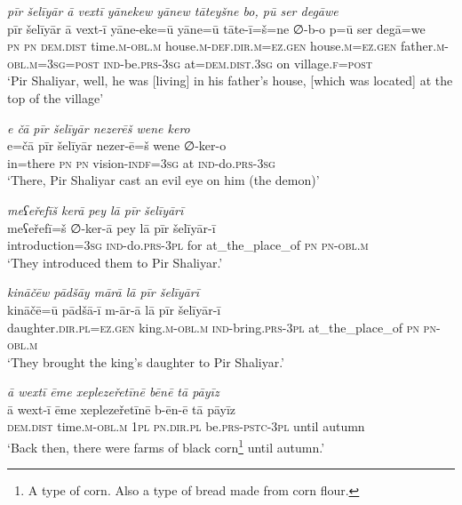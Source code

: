 \ea \label{ZP.65}
\textit{pīr šelīyār ā vextī yānekew yānew tāteyšne bo, pū ser degāwe} \\ 
\gll pīr šelīyār ā vext-ī yāne-eke=ū yāne=ū tāte-ī=š=ne ∅-b-o p=ū ser degā=we \\ 
 \textsc{pn} \textsc{pn} \textsc{dem.dist} time\textsc{.m}\textsc{-obl}\textsc{.m} house\textsc{.m}\textsc{-def}\textsc{.dir}\textsc{.m}\textsc{\textsc{=ez.gen}} house\textsc{.m}\textsc{\textsc{=ez.gen}} father\textsc{.m}\textsc{-obl}\textsc{.m}\textsc{=3sg}\textsc{=\textsc{post}} \textsc{ind-}be\textsc{.prs}\textsc{-3sg} at=\textsc{dem.dist}\textsc{.3sg} on village\textsc{.f}\textsc{=\textsc{post}} \\ 
\glt `Pir Shaliyar, well, he was [living] in his father’s house, [which was located] at the top of the village'
\z 
 
\ea \label{ZP.78}
\textit{e čā pīr šelīyār nezerēš wene kero} \\ 
\gll e=čā pīr šelīyār nezer-ē=š wene ∅-ker-o \\ 
 in=there \textsc{pn} \textsc{pn} vision\textsc{-indf}\textsc{=3sg} at \textsc{ind-}do\textsc{.prs}\textsc{-3sg} \\ 
\glt `There, Pir Shaliyar cast an evil eye on him (the demon)'
\z 
 
\ea \label{ZP.92}
\textit{meʕeřefīš kerā pey lā pīr šelīyārī} \\ 
\gll meʕeřefī=š ∅-ker-ā pey lā pīr šelīyār-ī \\ 
 introduction\textsc{=3sg} \textsc{ind-}do\textsc{.prs}\textsc{-3pl} for at\_the\_place\_of \textsc{pn} \textsc{pn}\textsc{-obl}\textsc{.m} \\ 
\glt `They introduced them to Pir Shaliyar.'
\z 
 
\ea \label{ZP.93}
\textit{kināčēw pādšāy mārā lā pīr šelīyārī} \\ 
\gll kināčē=ū pādšā-ī m-ār-ā lā pīr šelīyār-ī \\ 
 daughter\textsc{.dir}\textsc{.pl}\textsc{\textsc{=ez.gen}} king\textsc{.m}\textsc{-obl}\textsc{.m} \textsc{ind-}bring\textsc{.prs}\textsc{-3pl} at\_the\_place\_of \textsc{pn} \textsc{pn}\textsc{-obl}\textsc{.m} \\ 
\glt `They brought the king’s daughter to Pir Shaliyar.'
\z 
 
\ea \label{ZP.94}
\textit{ā wextī ēme xeplezeřetīnē bēnē tā pāyīz} \\ 
\gll ā wext-ī ēme xeplezeřetīnē b-ēn-ē tā pāyīz \\ 
 \textsc{dem.dist} time\textsc{.m}\textsc{-obl}\textsc{.m} \textsc{1pl} \textsc{pn}\textsc{.dir}\textsc{.pl} be\textsc{.prs}\textsc{-pstc}\textsc{-3pl} until autumn \\ 
\glt `Back then, there were farms of black corn\footnote{A type of corn. Also a type of bread made from corn flour.} until autumn.'
\z 
 

